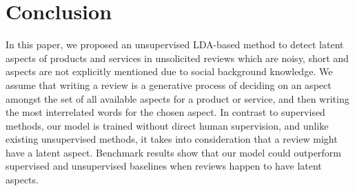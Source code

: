 \documentclass[11pt]{article}
\begin{document}
\section{Conclusion}
In this paper, we proposed an unsupervised LDA-based method to detect latent aspects of products and services in unsolicited reviews which are noisy, short and aspects are not explicitly mentioned due to social background knowledge. We assume that writing a review is a generative process of deciding on an aspect amongst the set of all available aspects for a product or service, and then writing the most interrelated words for the chosen aspect. In contrast to supervised methods, our model is trained without direct human supervision, and unlike existing unsupervised methods, it takes into consideration that a review might have a latent aspect. Benchmark results show that our model could outperform supervised and unsupervised baselines when reviews happen to have latent aspects.


\end{document}
